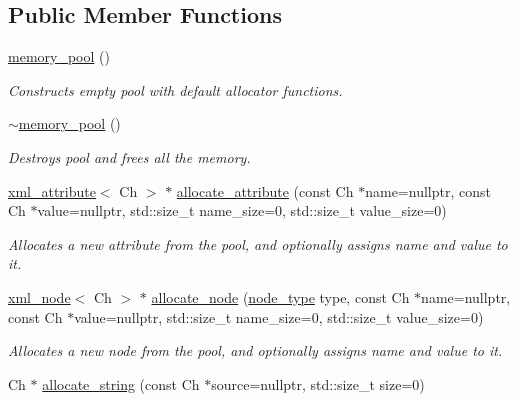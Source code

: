 \subsection*{Public Member Functions}
\begin{DoxyCompactItemize}
\item 
\mbox{\hyperlink{classrapidxml_1_1memory__pool_af8fb3c8f1a564f8045c40bcd07a89866}{memory\+\_\+pool}} ()
\begin{DoxyCompactList}\small\item\em Constructs empty pool with default allocator functions. \end{DoxyCompactList}\item 
\mbox{\hyperlink{classrapidxml_1_1memory__pool_a6f8c7990d9ec1ed2acf6558b238570eb}{$\sim$memory\+\_\+pool}} ()
\begin{DoxyCompactList}\small\item\em Destroys pool and frees all the memory. \end{DoxyCompactList}\item 
\mbox{\hyperlink{classrapidxml_1_1xml__attribute}{xml\+\_\+attribute}}$<$ Ch $>$ $\ast$ \mbox{\hyperlink{classrapidxml_1_1memory__pool_aa7286aec00dac6d9af11cdc69e1e470e}{allocate\+\_\+attribute}} (const Ch $\ast$name=nullptr, const Ch $\ast$value=nullptr, std\+::size\+\_\+t name\+\_\+size=0, std\+::size\+\_\+t value\+\_\+size=0)
\begin{DoxyCompactList}\small\item\em Allocates a new attribute from the pool, and optionally assigns name and value to it. \end{DoxyCompactList}\item 
\mbox{\hyperlink{classrapidxml_1_1xml__node}{xml\+\_\+node}}$<$ Ch $>$ $\ast$ \mbox{\hyperlink{classrapidxml_1_1memory__pool_af74bb7be25f96b10917ceb1975f0a8d1}{allocate\+\_\+node}} (\mbox{\hyperlink{namespacerapidxml_a6a276b85e2da28c5f9c3dbce61c55682}{node\+\_\+type}} type, const Ch $\ast$name=nullptr, const Ch $\ast$value=nullptr, std\+::size\+\_\+t name\+\_\+size=0, std\+::size\+\_\+t value\+\_\+size=0)
\begin{DoxyCompactList}\small\item\em Allocates a new node from the pool, and optionally assigns name and value to it. \end{DoxyCompactList}\item 
Ch $\ast$ \mbox{\hyperlink{classrapidxml_1_1memory__pool_a74228316f70642f61d6a3a9b7f9ab826}{allocate\+\_\+string}} (const Ch $\ast$source=nullptr, std\+::size\+\_\+t size=0)

\end{DoxyCompactItemize}
